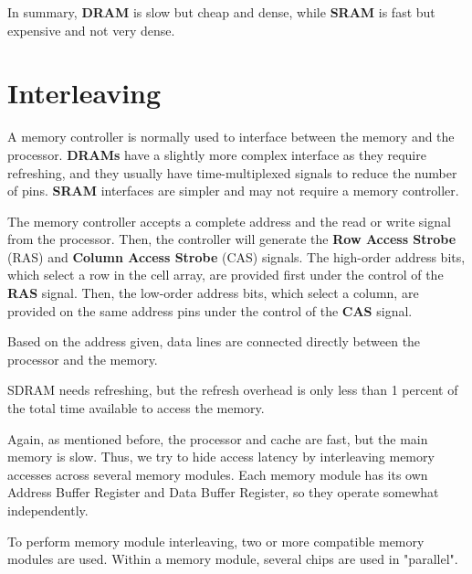 In summary, \textbf{DRAM} is slow but cheap and dense, while \textbf{SRAM} is fast but expensive and not very dense.

\section{Interleaving}
A memory controller is normally used to interface between the memory and the processor. \textbf{DRAMs} have a slightly more complex interface as they require refreshing, and they usually have time-multiplexed signals to reduce the number of pins. \textbf{SRAM} interfaces are simpler and may not require a memory controller.

The memory controller accepts a complete address and the read or write signal from the processor. Then, the controller will generate the \textbf{Row Access Strobe} (RAS) and \textbf{Column Access Strobe} (CAS) signals. The high-order address bits, which select a row in the cell array, are provided first under the control of the \textbf{RAS} signal. Then, the low-order address bits, which select a column, are provided on the same address pins under the control of the \textbf{CAS} signal.

Based on the address given, data lines are connected directly between the processor and the memory.

SDRAM needs refreshing, but the refresh overhead is only less than 1 percent of the total time available to access the memory.

Again, as mentioned before, the processor and cache are fast, but the main memory is slow. Thus, we try to hide access latency by interleaving memory accesses across several memory modules. Each memory module has its own Address Buffer Register and Data Buffer Register, so they operate somewhat independently.

To perform memory module interleaving, two or more compatible memory modules are used. Within a memory module, several chips are used in "parallel".

